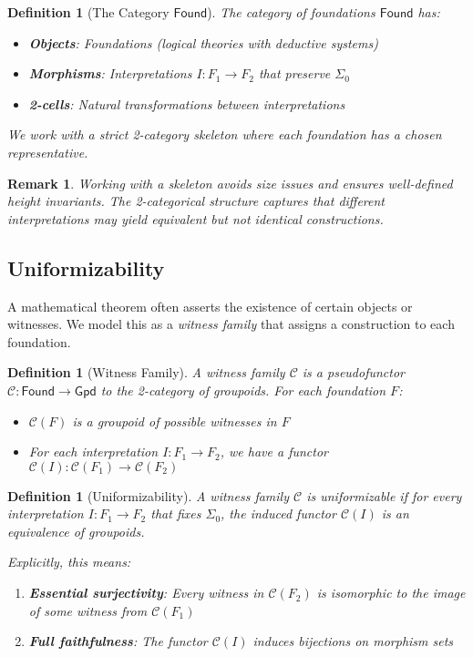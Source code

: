 \documentclass[11pt]{article}
\newtheorem{definition}[theorem]{Definition}
\newtheorem{remark}[theorem]{Remark}
\newcommand{\Found}{\mathsf{Found}}
\newcommand{\Gpd}{\mathsf{Gpd}}
\newcommand{\SigmaZero}{\Sigma_{0}}
\begin{document}
\begin{definition}[The Category \(\Found\)]
The \emph{category of foundations} $\Found$ has:
\begin{itemize}
\item \textbf{Objects}: Foundations (logical theories with deductive systems)
\item \textbf{Morphisms}: Interpretations $I: F_1 \to F_2$ that preserve $\SigmaZero$
\item \textbf{2-cells}: Natural transformations between interpretations
\end{itemize}
We work with a strict 2-category skeleton where each foundation has a chosen representative.
\end{definition}

\begin{remark}
Working with a skeleton avoids size issues and ensures well-defined height invariants. The 2-categorical structure captures that different interpretations may yield equivalent but not identical constructions.
\end{remark}

\subsection{Uniformizability}

A mathematical theorem often asserts the existence of certain objects or witnesses. We model this as a \emph{witness family} that assigns a construction to each foundation.

\begin{definition}[Witness Family]
A \emph{witness family} $\mathcal{C}$ is a pseudofunctor $\mathcal{C}: \Found \to \Gpd$ to the 2-category of groupoids. For each foundation $F$:
\begin{itemize}
\item $\mathcal{C}(F)$ is a groupoid of possible witnesses in $F$
\item For each interpretation $I: F_1 \to F_2$, we have a functor $\mathcal{C}(I): \mathcal{C}(F_1) \to \mathcal{C}(F_2)$
\end{itemize}
\end{definition}

\begin{definition}[Uniformizability]\label{def:uniformizable}
A witness family $\mathcal{C}$ is \emph{uniformizable} if for every interpretation $I: F_1 \to F_2$ that fixes $\SigmaZero$, the induced functor $\mathcal{C}(I)$ is an equivalence of groupoids.

Explicitly, this means:
\begin{enumerate}
\item \textbf{Essential surjectivity}: Every witness in $\mathcal{C}(F_2)$ is isomorphic to the image of some witness from $\mathcal{C}(F_1)$
\item \textbf{Full faithfulness}: The functor $\mathcal{C}(I)$ induces bijections on morphism sets
\end{enumerate}
\end{definition}
\end{document}
